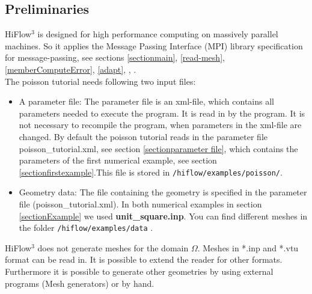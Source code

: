 \documentclass[a4paper, 11pt, twoside]{article}
\begin{document}
\subsection{Preliminaries}
HiFlow$^3$ is designed for high performance computing on massively parallel machines. 
So it applies the Message Passing Interface (MPI) library specification for message-passing, see sections \ref{sectionmain}, \ref{read-mesh}, \ref{memberComputeError}, \ref{adapt}, \cite{MPI}, \cite{MPIstandard} .\\
The poisson tutorial needs following two input files:
\begin{itemize}
\item A parameter file: The parameter file is an xml-file, which contains all parameters needed to execute the program. It is read in by the program. It is not necessary to recompile the program, when parameters in the xml-file are changed. By default the poisson tutorial reads in the parameter file poisson\_tutorial.xml, see section \ref{sectionparameter file}, which contains the parameters of the first numerical example, see section \ref{sectionfirstexample}.This file is stored in \verb'/hiflow/examples/poisson/'.  
\item Geometry data: The file containing the geometry is specified in the parameter file (poisson\_tutorial.xml). In both numerical examples in section \ref{sectionExample} we used \textbf{unit\_square.inp}. You can find different meshes in the folder \verb'/hiflow/examples/data' .
\end{itemize}

HiFlow$^3$ does not generate meshes for the domain $\Omega$. Meshes in *.inp and *.vtu format can be read in. 
It is possible to extend the reader for other formats.
Furthermore it is possible to generate other geometries by using external programs (Mesh generators) or by hand.\\  
\end{document}
